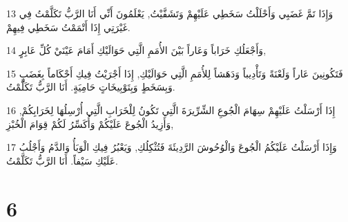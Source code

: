 \par 13 وَإِذَا تَمَّ غَضَبِي وَأَحْلَلْتُ سَخَطِي عَلَيْهِمْ وَتَشَفَّيْتُ, يَعْلَمُونَ أَنِّي أَنَا الرَّبُّ تَكَلَّمْتُ فِي غَيْرَتِي إِذَا أَتْمَمْتُ سَخَطِي فِيهِمْ.
\par 14 وَأَجْعَلُكِ خَرَاباً وَعَاراً بَيْنَ الأُمَمِ الَّتِي حَوَالَيْكِ أَمَامَ عَيْنَيْ كُلِّ عَابِرٍ,
\par 15 فَتَكُونِينَ عَاراً وَلَعْنَةً وَتَأْدِيباً وَدَهَشاً لِلأُمَمِ الَّتِي حَوَالَيْكِ, إِذَا أَجْرَيْتُ فِيكِ أَحْكَاماً بِغَضَبٍ وَبِسَخَطٍ وَبِتَوْبِيخَاتٍ حَامِيَةٍ. أَنَا الرَّبُّ تَكَلَّمْتُ.
\par 16 إِذَا أَرْسَلْتُ عَلَيْهِمْ سِهَامَ الْجُوعِ الشِّرِّيرَةَ الَّتِي تَكُونُ لِلْخَرَابِ الَّتِي أُرْسِلُهَا لِخَرَابِكُمْ, وَأَزِيدُ الْجُوعَ عَلَيْكُمْ وَأُكَسِّرُ لَكُمْ قِوَامَ الْخُبْزِ,
\par 17 وَإِذَا أَرْسَلْتُ عَلَيْكُمُ الْجُوعَ وَالْوُحُوشَ الرَّدِيئَةَ فَتُثْكِلُكِ, وَيَعْبُرُ فِيكِ الْوَبَأُ وَالدَّمُ وَأَجْلُبُ عَلَيْكِ سَيْفاً. أَنَا الرَّبُّ تَكَلَّمْتُ.

\chapter{6}

